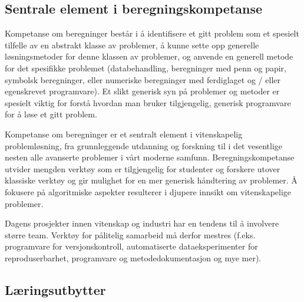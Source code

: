 \documentclass{article}
\begin{document}
\noindent
\subsection{Sentrale element i beregningskompetanse}

Kompetanse om beregninger består i å identifisere et gitt problem som et spesielt tilfelle av en abstrakt klasse av problemer, å kunne sette opp generelle løsningsmetoder for denne klassen av problemer, og anvende en generell metode for det spesifikke problemet (databehandling, beregninger med penn og papir, symbolsk beregninger, eller
numeriske beregninger med ferdiglaget og / eller egenskrevet programvare). Et slikt 
generisk syn på problemer og metoder er spesielt viktig for
forstå hvordan man bruker tilgjengelig, generisk programvare for å løse et gitt problem.


Kompetanse om beregninger er et sentralt element
i vitenskapelig problemløsning, fra grunnleggende utdanning og forskning til
i det vesentlige nesten alle avanserte problemer i vårt moderne
samfunn. Beregningskompetanse  utvider mengden verktøy som er tilgjengelig for studenter og
forskere utover klassiske verktøy og gir mulighet for en mer generisk
håndtering av problemer. Å fokusere på algoritmiske aspekter resulterer i
djupere innsikt om vitenskapelige problemer.

Dagens prosjekter innen vitenskap og industri har en tendens til å involvere større team. Verktøy for pålitelig samarbeid må derfor mestres (f.eks. programvare for versjonskontroll, automatiserte dataeksperimenter for reproduserbarhet, programvare og metodedokumentasjon og mye mer).







\subsection{Læringsutbytter }
\end{document}
